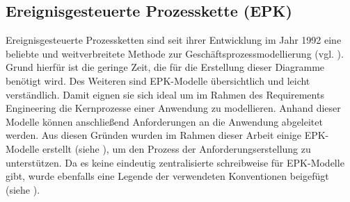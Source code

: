 
\subsection{Ereignisgesteuerte Prozesskette (EPK)}\label{subsec:epk)}
Ereignisgesteuerte Prozessketten sind seit ihrer Entwicklung im Jahr 1992 eine beliebte und weitverbreitete Methode zur 
Geschäftsprozessmodellierung (vgl. \autocite{epc-diagram}).
Grund hierfür ist die geringe Zeit, die für die Erstellung dieser Diagramme benötigt wird.
Des Weiteren sind EPK-Modelle übersichtlich und leicht verständlich.
Damit eignen sie sich ideal um im Rahmen des Requirements Engineering die Kernprozesse einer Anwendung zu modellieren.
Anhand dieser Modelle können anschließend Anforderungen an die Anwendung abgeleitet werden.
Aus diesen Gründen wurden im Rahmen dieser Arbeit einige EPK-Modelle erstellt (siehe ), um den Prozess der Anforderungserstellung zu unterstützen.
Da es keine eindeutig zentralisierte schreibweise für EPK-Modelle gibt, wurde ebenfalls eine Legende der verwendeten Konventionen beigefügt (siehe ).
